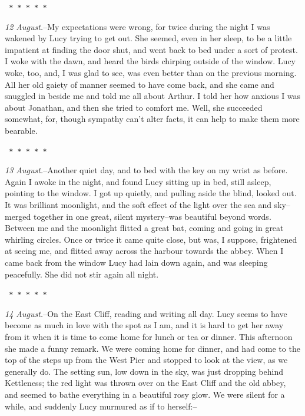 \documentclass[12pt,openright]{book}
\begin{document}
\texttt{   *       *       *       *       *}

\textit{12 August.}–My expectations were wrong, for twice during the night I was wakened by Lucy trying to get out. She seemed, even in her sleep, to be a little impatient at finding the door shut, and went back to bed under a sort of protest. I woke with the dawn, and heard the birds chirping outside of the window. Lucy woke, too, and, I was glad to see, was even better than on the previous morning. All her old gaiety of manner seemed to have come back, and she came and snuggled in beside me and told me all about Arthur. I told her how anxious I was about Jonathan, and then she tried to comfort me. Well, she succeeded somewhat, for, though sympathy can’t alter facts, it can help to make them more bearable.

\texttt{   *       *       *       *       *}

\textit{13 August.}–Another quiet day, and to bed with the key on my wrist as before. Again I awoke in the night, and found Lucy sitting up in bed, still asleep, pointing to the window. I got up quietly, and pulling aside the blind, looked out. It was brilliant moonlight, and the soft effect of the light over the sea and sky–merged together in one great, silent mystery–was beautiful beyond words. Between me and the moonlight flitted a great bat, coming and going in great whirling circles. Once or twice it came quite close, but was, I suppose, frightened at seeing me, and flitted away across the harbour towards the abbey. When I came back from the window Lucy had lain down again, and was sleeping peacefully. She did not stir again all night.

\texttt{   *       *       *       *       *}

\textit{14 August.}–On the East Cliff, reading and writing all day. Lucy seems to have become as much in love with the spot as I am, and it is hard to get her away from it when it is time to come home for lunch or tea or dinner. This afternoon she made a funny remark. We were coming home for dinner, and had come to the top of the steps up from the West Pier and stopped to look at the view, as we generally do. The setting sun, low down in the sky, was just dropping behind Kettleness; the red light was thrown over on the East Cliff and the old abbey, and seemed to bathe everything in a beautiful rosy glow. We were silent for a while, and suddenly Lucy murmured as if to herself:–
\end{document}
